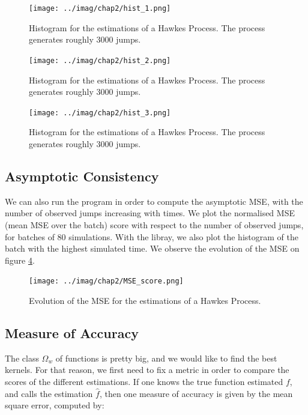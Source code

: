 \documentclass[11pt]{book}
\begin{document}
\begin{figure}
\centering
\texttt{[image: ../imag/chap2/hist\_1.png]}
\caption{Histogram for the estimations of a Hawkes Process. The process generates roughly 3000 jumps.}
\label{fig:hist_1_alpha}
\end{figure}


\begin{figure}
\centering
\texttt{[image: ../imag/chap2/hist\_2.png]}
\caption{Histogram for the estimations of a Hawkes Process. The process generates roughly 3000 jumps.}
\label{fig:hist_1_beta}
\end{figure}


\begin{figure}
\centering
\texttt{[image: ../imag/chap2/hist\_3.png]}
\caption{Histogram for the estimations of a Hawkes Process. The process generates roughly 3000 jumps.}
\label{fig:hist_1_nu}
\end{figure}


\subsection{Asymptotic Consistency}

We can also run the program in order to compute the asymptotic MSE, with the number of observed jumps increasing with times. We plot the normalised MSE (mean MSE over the batch) score with respect to the number of observed jumps, for batches of 80 simulations. With the libray, we also plot the histogram of the batch with the highest simulated time. We observe the evolution of the MSE on figure \ref{fig:MSE_1}.





\begin{figure}
\centering
\texttt{[image: ../imag/chap2/MSE\_score.png]}
\caption{Evolution of the MSE for the estimations of a Hawkes Process.}
\label{fig:MSE_1}
\end{figure}











\subsection{Measure of Accuracy}
The class $ \Omega_w $ of functions is pretty big, and we would like to find the best kernels. For that reason, we first need to fix a metric in order to compare the scores of the different estimations. If one knows the true function estimated $f$, and calls the estimation $\hat{f}$, then one measure of accuracy is given by the mean square error, computed by: 
\end{document}
